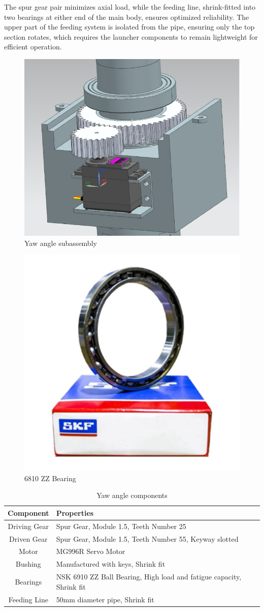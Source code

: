 \documentclass[12pt]{report}
\begin{document}
The spur gear pair minimizes axial load, while the feeding line, shrink-fitted into two bearings at either end of the main body, ensures optimized reliability. The upper part of the feeding system is isolated from the pipe, ensuring only the top section rotates, which requires the launcher components to remain lightweight for efficient operation.

\begin{figure}[h!]
    \centering
    \includegraphics[width=0.5\linewidth]{2.3.3.1.png}
    \caption{Yaw angle subassembly}
    \label{fig:enter-label}
\end{figure}

\begin{figure}[h!]
    \centering
    \includegraphics[width=0.3\linewidth]{2.3.3.2.png}
    \caption{6810 ZZ Bearing}
    \label{fig:enter-label}
\end{figure}

\begin{table}[h!]
\scriptsize
\centering
\caption{Yaw angle components}
\begin{tabular}{|c|p{9cm}|}
\hline
\textbf{Component} & \textbf{Properties} \\ \hline
Driving Gear & Spur Gear, Module 1.5, Teeth Number 25 \\ \hline
Driven Gear & Spur Gear, Module 1.5, Teeth Number 55, Keyway slotted \\ \hline
Motor & MG996R Servo Motor \\ \hline
Bushing & Manufactured with keys, Shrink fit \\ \hline
Bearings & NSK 6910 ZZ Ball Bearing, High load and fatigue capacity, Shrink fit \\ \hline
Feeding Line & 50mm diameter pipe, Shrink fit \\ \hline
\end{tabular}
\label{table:yaw_components}
\end{table}
\end{document}
